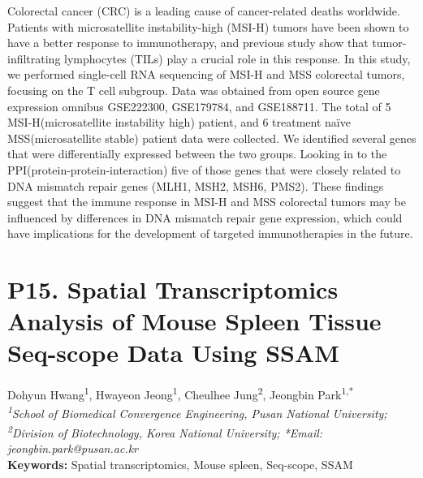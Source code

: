 \noindent
Colorectal cancer (CRC) is a leading cause of cancer-related deaths worldwide. Patients with microsatellite instability-high (MSI-H) tumors have been shown to have a better response to immunotherapy, and previous study show that tumor-infiltrating lymphocytes (TILs) play a crucial role in this response. In this study, we performed single-cell RNA sequencing of MSI-H and MSS colorectal tumors, focusing on the T cell subgroup. Data was obtained from open source gene expression omnibus GSE222300, GSE179784, and GSE188711. The total of 5 MSI-H(microsatellite instability high) patient, and 6 treatment naïve MSS(microsatellite stable) patient data were collected. We identified several genes that were differentially expressed between the two groups. Looking in to the PPI(protein-protein-interaction) five of those genes that were closely related to DNA mismatch repair genes (MLH1, MSH2, MSH6, PMS2). These findings suggest that the immune response in MSI-H and MSS colorectal tumors may be influenced by differences in DNA mismatch repair gene expression, which could have implications for the development of targeted immunotherapies in the future.
\newpage

\section*{P15. Spatial Transcriptomics Analysis of Mouse Spleen Tissue Seq-scope Data Using SSAM}

\begin{center}
Dohyun Hwang\textsuperscript{1}, Hwayeon Jeong\textsuperscript{1}, Cheulhee Jung\textsuperscript{2}, Jeongbin Park\textsuperscript{1,*} \\
\vspace{0.2cm}
\textit{\textsuperscript{1}School of Biomedical Convergence Engineering, Pusan National University; \textsuperscript{2}Division of Biotechnology, Korea National University; *Email: jeongbin.park@pusan.ac.kr} \\
\vspace{0.2cm}
\textbf{Keywords:} Spatial transcriptomics, Mouse spleen, Seq-scope, SSAM
\end{center}

